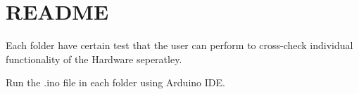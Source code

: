 \chapter{README}
\hypertarget{md_test_2_r_e_a_d_m_e}{}\label{md_test_2_r_e_a_d_m_e}

\begin{DoxyItemize}
\item Each folder have certain test that the user can perform to cross-\/check individual functionality of the Hardware seperatley.
\item Run the {\ttfamily .ino} file in each folder using Arduino IDE. 
\end{DoxyItemize}